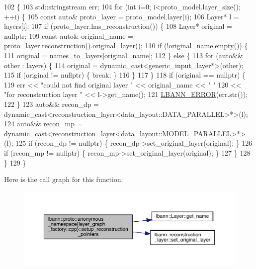 \begin{DoxyCode}
102                                                                        \{
103   std::stringstream err;
104   \textcolor{keywordflow}{for} (\textcolor{keywordtype}{int} i=0; i<proto\_model.layer\_size(); ++i) \{
105     \textcolor{keyword}{const} \textcolor{keyword}{auto}& proto\_layer = proto\_model.layer(i);
106     Layer* l = layers[i];
107     \textcolor{keywordflow}{if} (proto\_layer.has\_reconstruction()) \{
108       Layer* original = \textcolor{keyword}{nullptr};
109       \textcolor{keyword}{const} \textcolor{keyword}{auto}& original\_name = proto\_layer.reconstruction().original\_layer();
110       \textcolor{keywordflow}{if} (!original\_name.empty()) \{
111         original = names\_to\_layers[original\_name];
112       \} \textcolor{keywordflow}{else} \{
113         \textcolor{keywordflow}{for} (\textcolor{keyword}{auto}&& other : layers) \{
114           original = \textcolor{keyword}{dynamic\_cast<}generic\_input\_layer*\textcolor{keyword}{>}(other);
115           \textcolor{keywordflow}{if} (original != \textcolor{keyword}{nullptr}) \{ \textcolor{keywordflow}{break}; \}
116         \}
117       \}
118       \textcolor{keywordflow}{if} (original == \textcolor{keyword}{nullptr}) \{
119         err << \textcolor{stringliteral}{"could not find original layer "} << original\_name << \textcolor{stringliteral}{" "}
120             << \textcolor{stringliteral}{"for reconstruction layer "} << l->get\_name();
121         \hyperlink{base_8hpp_a80b1d707117e968a6951b7222e4b2b87}{LBANN\_ERROR}(err.str());
122       \}
123       \textcolor{keyword}{auto}&& recon\_dp = \textcolor{keyword}{dynamic\_cast<}reconstruction\_layer<data\_layout::DATA\_PARALLEL>*\textcolor{keyword}{>}(l);
124       \textcolor{keyword}{auto}&& recon\_mp = \textcolor{keyword}{dynamic\_cast<}reconstruction\_layer<data\_layout::MODEL\_PARALLEL>*\textcolor{keyword}{>}(l);
125       \textcolor{keywordflow}{if} (recon\_dp != \textcolor{keyword}{nullptr}) \{ recon\_dp->set\_original\_layer(original); \}
126       \textcolor{keywordflow}{if} (recon\_mp != \textcolor{keyword}{nullptr}) \{ recon\_mp->set\_original\_layer(original); \}
127     \}
128   \}  
129 \}
\end{DoxyCode}
Here is the call graph for this function\+:\nopagebreak
\begin{figure}[H]
\begin{center}
\leavevmode
\includegraphics[width=350pt]{namespacelbann_1_1proto_1_1anonymous__namespace_02layer__graph__factory_8cpp_03_ac0c3ac49d16d6926308c336149a2f039_cgraph}
\end{center}
\end{figure}
